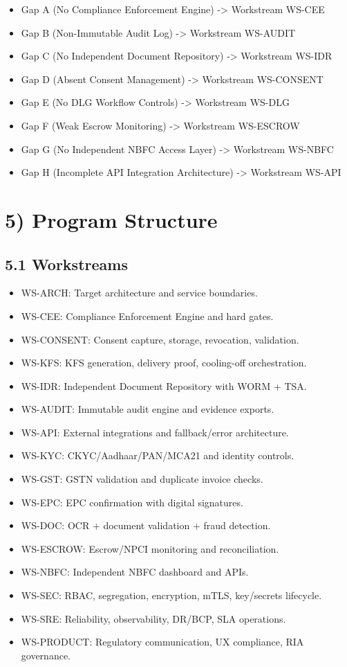 ﻿\documentclass[12pt]{article}
\begin{document}
\begin{itemize}
\item Gap A (No Compliance Enforcement Engine) -> Workstream WS-CEE
\item Gap B (Non-Immutable Audit Log) -> Workstream WS-AUDIT
\item Gap C (No Independent Document Repository) -> Workstream WS-IDR
\item Gap D (Absent Consent Management) -> Workstream WS-CONSENT
\item Gap E (No DLG Workflow Controls) -> Workstream WS-DLG
\item Gap F (Weak Escrow Monitoring) -> Workstream WS-ESCROW
\item Gap G (No Independent NBFC Access Layer) -> Workstream WS-NBFC
\item Gap H (Incomplete API Integration Architecture) -> Workstream WS-API
\end{itemize}

\section{5) Program Structure}


\subsection{5.1 Workstreams}


\begin{itemize}
\item WS-ARCH: Target architecture and service boundaries.
\item WS-CEE: Compliance Enforcement Engine and hard gates.
\item WS-CONSENT: Consent capture, storage, revocation, validation.
\item WS-KFS: KFS generation, delivery proof, cooling-off orchestration.
\item WS-IDR: Independent Document Repository with WORM + TSA.
\item WS-AUDIT: Immutable audit engine and evidence exports.
\item WS-API: External integrations and fallback/error architecture.
\item WS-KYC: CKYC/Aadhaar/PAN/MCA21 and identity controls.
\item WS-GST: GSTN validation and duplicate invoice checks.
\item WS-EPC: EPC confirmation with digital signatures.
\item WS-DOC: OCR + document validation + fraud detection.
\item WS-ESCROW: Escrow/NPCI monitoring and reconciliation.
\item WS-NBFC: Independent NBFC dashboard and APIs.
\item WS-SEC: RBAC, segregation, encryption, mTLS, key/secrets lifecycle.
\item WS-SRE: Reliability, observability, DR/BCP, SLA operations.
\item WS-PRODUCT: Regulatory communication, UX compliance, RIA governance.
\end{itemize}
\end{document}
